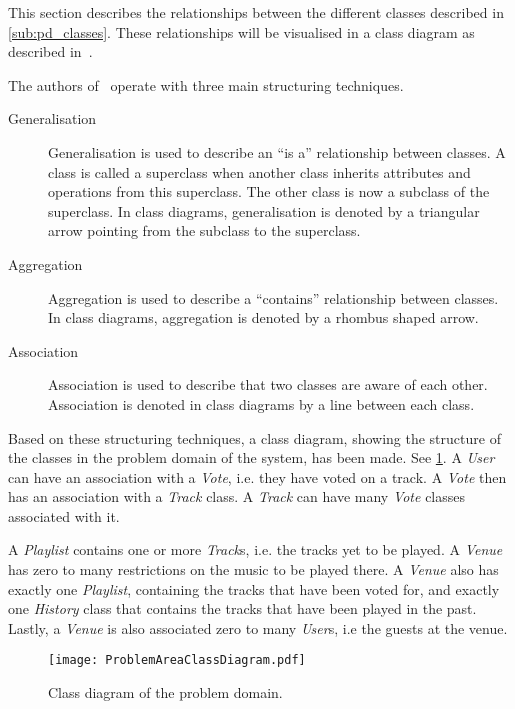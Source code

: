 This section describes the relationships between the different classes
described in \cref{sub:pd_classes}. These relationships will be
visualised in a class diagram as described
in~.

The authors of~ operate with three
main structuring techniques.

\begin{description}
\item[Generalisation] Generalisation is used to describe an \enquote{is a}
  relationship between classes. A class is called a
  superclass when another class inherits attributes and operations
  from this superclass. The other class is now a subclass of the
  superclass. In class diagrams, generalisation is denoted by a
  triangular arrow pointing from the subclass to the superclass.
\item[Aggregation] Aggregation is used to describe a
  \enquote{contains} relationship between classes. In class diagrams,
  aggregation is denoted by a rhombus shaped arrow.
\item[Association] Association is used to describe that two classes
  are aware of each other. Association is denoted in class diagrams by
  a line between each class.
\end{description}

Based on these structuring techniques, a class diagram, showing the
structure of the classes in the problem domain of the system, has been
made. See \cref{fig:pd_structure}. A \textit{User} can have an
association with a \textit{Vote}, i.e. they have voted on a track. A
\textit{Vote} then has an association with a \textit{Track} class. A
\textit{Track} can have many \textit{Vote} classes associated with
it.

A \textit{Playlist} contains one or more \textit{Track}s, i.e. the
tracks yet to be played. A \textit{Venue} has zero to many
restrictions on the music to be played there. A \textit{Venue} also
has exactly one \textit{Playlist}, containing the tracks that have
been voted for, and exactly one \textit{History} class that contains
the tracks that have been played in the past. Lastly, a \textit{Venue} is also associated zero to
many \textit{User}s, i.e the guests at the venue.

\begin{figure}[htbp]
  \centering
  \texttt{[image: ProblemAreaClassDiagram.pdf]}
  \caption{Class diagram of the problem domain.}\label{fig:pd_structure}
\end{figure}

